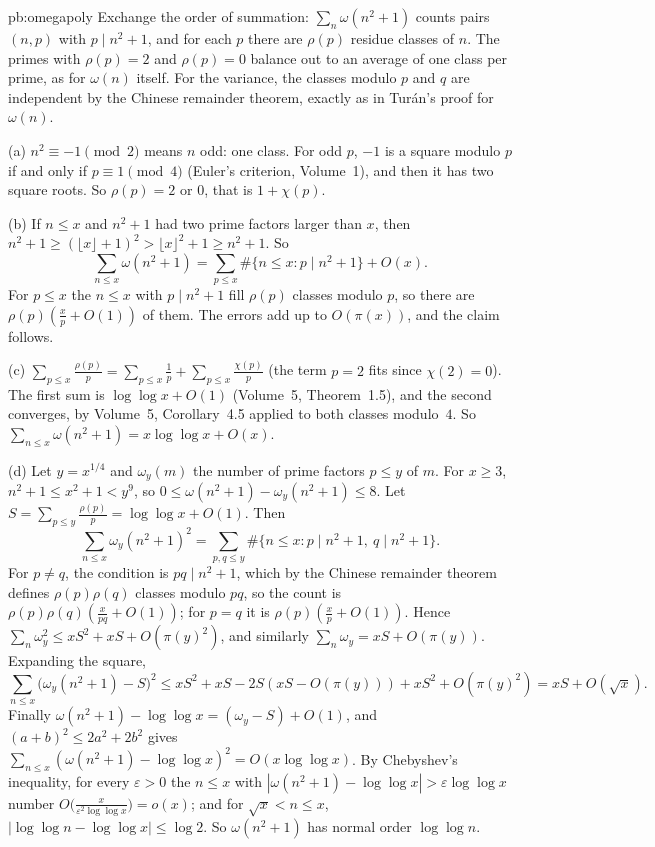 \begin{solution}{pb:omegapoly}
\idea Exchange the order of summation: $\sum_n\omega(n^2+1)$ counts pairs $(n,p)$ with $p\mid n^2+1$, and for each $p$ there are $\rho(p)$ residue classes of $n$. The primes with
$\rho(p)=2$ and $\rho(p)=0$ balance out to an average of one class per prime, as for $\omega(n)$ itself. For the variance, the classes modulo $p$ and $q$ are independent by the
Chinese remainder theorem, exactly as in Tur\'an's proof for $\omega(n)$.

\writeup (a) $n^2\equiv-1\pmod2$ means $n$ odd: one class. For odd $p$, $-1$ is a square modulo $p$ if and only if $p\equiv1\pmod4$ (Euler's criterion, Volume~1), and then it has
two square roots. So $\rho(p)=2$ or $0$, that is $1+\chi(p)$.

(b) If $n\le x$ and $n^2+1$ had two prime factors larger than $x$, then $n^2+1\ge(\lfloor x\rfloor+1)^2>\lfloor x\rfloor^2+1\ge n^2+1$. So
\[
\sum_{n\le x}\omega(n^2+1)=\sum_{p\le x}\#\{n\le x:p\mid n^2+1\}+O(x).
\]
For $p\le x$ the $n\le x$ with $p\mid n^2+1$ fill $\rho(p)$ classes modulo $p$, so there are $\rho(p)(\frac xp+O(1))$ of them. The errors add up to $O(\pi(x))$, and the claim follows.

(c) $\sum_{p\le x}\frac{\rho(p)}p=\sum_{p\le x}\frac1p+\sum_{p\le x}\frac{\chi(p)}p$ (the term $p=2$ fits since $\chi(2)=0$). The first sum is $\log\log x+O(1)$ (Volume~5, Theorem~1.5),
and the second converges, by Volume~5, Corollary~4.5 applied to both classes modulo~$4$. So $\sum_{n\le x}\omega(n^2+1)=x\log\log x+O(x)$.

(d) Let $y=x^{1/4}$ and $\omega_y(m)$ the number of prime factors $p\le y$ of $m$. For $x\ge3$, $n^2+1\le x^2+1<y^9$, so $0\le\omega(n^2+1)-\omega_y(n^2+1)\le8$. Let
$S=\sum_{p\le y}\frac{\rho(p)}p=\log\log x+O(1)$. Then
\[
\sum_{n\le x}\omega_y(n^2+1)^2=\sum_{p,q\le y}\#\{n\le x:p\mid n^2+1,\ q\mid n^2+1\}.
\]
For $p\ne q$, the condition is $pq\mid n^2+1$, which by the Chinese remainder theorem defines $\rho(p)\rho(q)$ classes modulo $pq$, so the count is $\rho(p)\rho(q)(\frac x{pq}+O(1))$;
for $p=q$ it is $\rho(p)(\frac xp+O(1))$. Hence $\sum_n\omega_y^2\le xS^2+xS+O(\pi(y)^2)$, and similarly $\sum_n\omega_y=xS+O(\pi(y))$. Expanding the square,
\[
\sum_{n\le x}\bigl(\omega_y(n^2+1)-S\bigr)^2\le xS^2+xS-2S(xS-O(\pi(y)))+xS^2+O(\pi(y)^2)=xS+O(\sqrt x).
\]
Finally $\omega(n^2+1)-\log\log x=(\omega_y-S)+O(1)$, and $(a+b)^2\le2a^2+2b^2$ gives $\sum_{n\le x}(\omega(n^2+1)-\log\log x)^2=O(x\log\log x)$. By Chebyshev's inequality, for every
$\varepsilon>0$ the $n\le x$ with $|\omega(n^2+1)-\log\log x|>\varepsilon\log\log x$ number $O\bigl(\frac x{\varepsilon^2\log\log x}\bigr)=o(x)$; and for $\sqrt x<n\le x$,
$|\log\log n-\log\log x|\le\log2$. So $\omega(n^2+1)$ has normal order $\log\log n$.


\end{solution}
